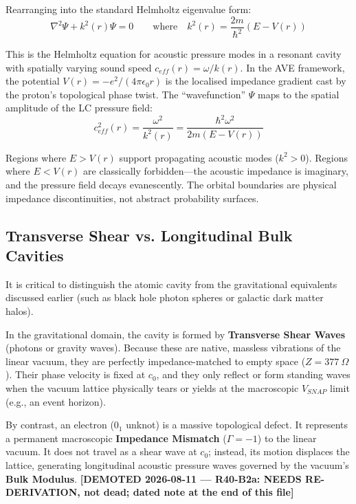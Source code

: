Rearranging into the standard Helmholtz eigenvalue form:
\begin{equation}
    \nabla^2 \Psi + k^2(r)\Psi = 0 \qquad \text{where} \quad k^2(r) = \frac{2m}{\hbar^2}(E - V(r))
\end{equation}

This is the Helmholtz equation for acoustic pressure modes in a resonant cavity with spatially varying sound speed $c_{eff}(r) = \omega / k(r)$. In the AVE framework, the potential $V(r) = -e^2/(4\pi\epsilon_0 r)$ is the localised impedance gradient cast by the proton's topological phase twist. The ``wavefunction'' $\Psi$ maps to the spatial amplitude of the LC pressure field:
\begin{equation}
    c_{eff}^2(r) = \frac{\omega^2}{k^2(r)} = \frac{\hbar^2 \omega^2}{2m(E - V(r))}
\end{equation}

Regions where $E > V(r)$ support propagating acoustic modes ($k^2 > 0$). Regions where $E < V(r)$ are classically forbidden---the acoustic impedance is imaginary, and the pressure field decays evanescently. The orbital boundaries are physical impedance discontinuities, not abstract probability surfaces.

\subsection{Transverse Shear vs. Longitudinal Bulk Cavities}
It is critical to distinguish the atomic cavity from the gravitational equivalents discussed earlier (such as black hole photon spheres or galactic dark matter halos). 

In the gravitational domain, the cavity is formed by \textbf{Transverse Shear Waves} (photons or gravity waves). Because these are native, massless vibrations of the linear vacuum, they are perfectly impedance-matched to empty space ($Z = 377 \ \Omega$). Their phase velocity is fixed at $c_0$, and they only reflect or form standing waves when the vacuum lattice physically tears or yields at the macroscopic $V_{SNAP}$ limit (e.g., an event horizon).

By contrast, an electron ($0_1$ unknot) is a massive topological defect. It represents a permanent macroscopic \textbf{Impedance Mismatch} ($\Gamma = -1$\gammaundeclared{}) to the linear vacuum. It does not travel as a shear wave at $c_0$; instead, its motion displaces the lattice, generating longitudinal acoustic pressure waves governed by the vacuum's \textbf{Bulk Modulus}. \textbf{[DEMOTED 2026-08-11 --- R40-B2a: NEEDS RE-DERIVATION, not dead; dated note at the end of this file]}

